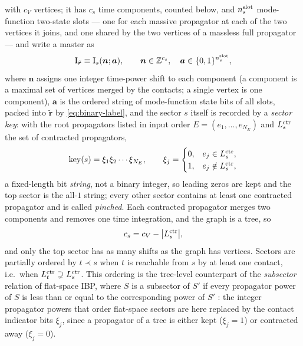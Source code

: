 \documentclass[11pt,a4paper]{article}
\begin{document}
with $c_V$ vertices; it has $c_s$ time components, counted below, and $n^{\rm slot}_s$ mode-function two-state
slots --- one for each massive
propagator at each of the two vertices it joins, and one shared by the two vertices of a massless
full propagator --- and write a master as
\begin{equation}
  \text{I}_{\tilde{\bm r}}\equiv \text{I}_{s}(\bm n;\bm a),
  \qquad \bm n\in\mathbb Z^{c_s},\quad \bm a\in\{0,1\}^{n^{\rm slot}_s},
  \label{eq:graph-index}
\end{equation}
where $\bm n$ assigns one integer time-power shift to each component (a component is a maximal set
of vertices merged by the contacts; a single vertex is one component), $\bm a$ is the ordered
string of mode-function state bits of all slots, packed into $\tilde{\bm r}$ by \eqref{eq:binary-label}, and the
sector $s$ itself is recorded by a \emph{sector key}: with the root propagators listed in input
order $E=(e_1,\dots,e_{N_E})$ and $L_s^{\rm ctr}$ the set of contracted propagators,
\begin{equation}
  \operatorname{key}(s)=\xi_1\xi_2\cdots\xi_{N_E},
  \qquad \xi_j=\begin{cases}0,&e_j\in L_s^{\rm ctr},\\1,&e_j\notin L_s^{\rm ctr},\end{cases}
  \label{eq:sector-key}
\end{equation}
a fixed-length bit \emph{string}, not a binary integer, so leading zeros are kept and the top
sector is the all-$1$ string; every other sector contains at least one contracted propagator and
is called \emph{pinched}. Each contracted propagator merges two components and removes one time
integration, and the graph is a tree, so
\begin{equation}
  c_s=c_V-\big|L_s^{\rm ctr}\big|,
  \label{eq:component-count}
\end{equation}
and only the top sector has as many shifts as the graph has vertices. Sectors are partially ordered
by $t\prec s$ when $t$ is reachable from $s$ by at least one contact, i.e.\ when
$L_t^{\rm ctr}\supsetneq L_s^{\rm ctr}$. This ordering is the tree-level counterpart of the
\emph{subsector} relation of flat-space IBP, where $S$ is a subsector of $S'$ if every propagator
power of $S$ is less than or equal to the corresponding power of $S'$ \cite{Klappert:2020nbg}: the
integer propagator powers that order flat-space sectors are here replaced by the contact indicator
bits $\xi_j$, since a propagator of a tree is either kept ($\xi_j=1$) or contracted away
($\xi_j=0$).
\end{document}
